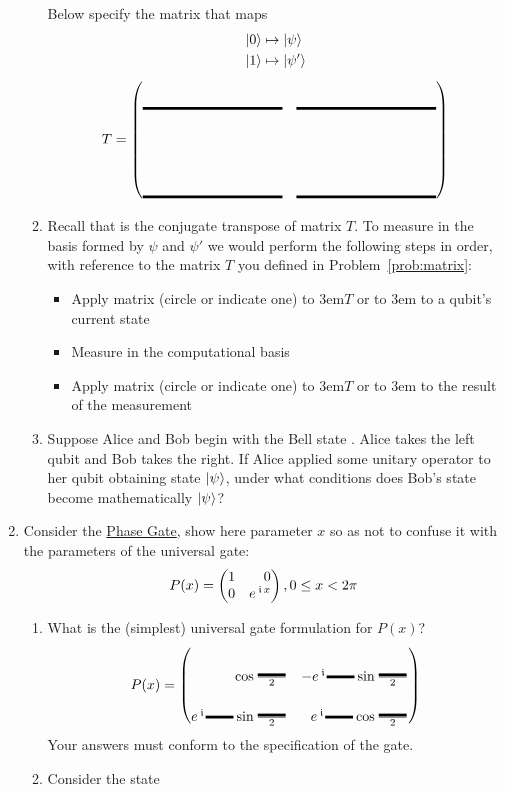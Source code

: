 \documentclass[12pt]{article}
\begin{document}
\begin{enumerate}
\begin{enumerate}[label=\theenumi.\arabic*]
Below specify the matrix that maps
\begin{align*}
    \ket{0} &\mapsto \ket{\psi} \\
    \ket{1} &\mapsto \ket{\psi'}
\end{align*}
\[
T = \begin{pmatrix*}[r]
\Blank[10em]{} & \Blank[10em]{} \\[4em]
\Blank[10em]{} & \Blank[10em]{}
\end{pmatrix*}
\]
\item Recall that  is the conjugate transpose of matrix $T$.  To measure in the basis formed by $\psi$ and $\psi'$ we would perform the following steps in order, with reference to the matrix $T$ you defined in Problem~\ref{prob:matrix}:
\begin{itemize}
    \item Apply matrix (circle or indicate one) \hbox to 3em{\hss$T$\hss} or \hbox to 3em{\hss{}\hss}  to a qubit's current state
    \item Measure in the computational basis
    \item Apply matrix (circle or indicate one) \hbox to 3em{\hss$T$\hss} or \hbox to 3em{\hss{}\hss}  to the result of the measurement
\end{itemize}
\item Suppose Alice and Bob begin with the Bell state . Alice takes the left qubit and Bob takes the right. If Alice applied some unitary operator  to her qubit obtaining state $\ket{\psi_{}}$, under what conditions does Bob's state become mathematically $\ket{\psi_{}}$?
\LeaveSpace{}
\end{enumerate}
\item Consider the \href{https://docs.quantum.ibm.com/api/qiskit/qiskit.circuit.library.PhaseGate}{Phase Gate}, show here parameter $x$ so as not to confuse it with the parameters of the universal  gate:
\[
P(x) = \SQBG{\relax}{1}{0}{0}{\ExpPhase{x}}, 0\leq x < 2\pi
\]
\begin{enumerate}[label=\theenumi.\arabic*]
  \item What is the (simplest) universal gate formulation for $P(x)$?
  \[
  P(x) = \SQBG{\relax}{\cos{\frac{\Blank[2em]}{2}}}{-\ExpPhase{\Blank[2em]}\sin{\frac{\Blank[2em]}{2}}}{\ExpPhase{\Blank[2em]}\sin{\frac{\Blank[2em]}{2}}}{\ExpPhase{\Blank[2em]}\cos{\frac{\Blank[2em]}{2}}}
  \]
  Your answers must conform to the specification of the  gate.
  \item Consider the state \[
\]
\end{enumerate}
\end{enumerate}
\end{document}
